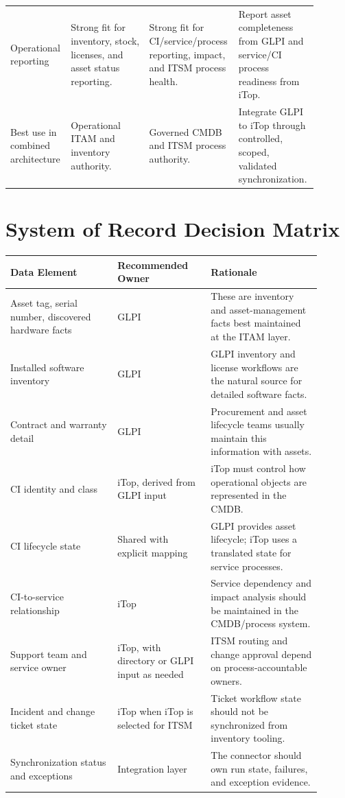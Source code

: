 \documentclass[11pt]{article}
\begin{document}
\begin{landscape}
\begin{longtable}{p{0.16\linewidth}p{0.25\linewidth}p{0.25\linewidth}p{0.23\linewidth}}
\addlinespace
Operational reporting & Strong fit for inventory, stock, licenses, and asset status reporting. & Strong fit for CI/service/process reporting, impact, and ITSM process health. & Report asset completeness from GLPI and service/CI process readiness from iTop. \\
\addlinespace
Best use in combined architecture & Operational ITAM and inventory authority. & Governed CMDB and ITSM process authority. & Integrate GLPI to iTop through controlled, scoped, validated synchronization. \\
\bottomrule
\end{longtable}
\normalsize
\end{landscape}

\section{System of Record Decision Matrix}

\begin{longtable}{p{0.31\linewidth}p{0.27\linewidth}p{0.32\linewidth}}
\toprule
\rowcolor{LightBlue}\textbf{Data Element} & \textbf{Recommended Owner} & \textbf{Rationale} \\
\midrule
Asset tag, serial number, discovered hardware facts & GLPI & These are inventory and asset-management facts best maintained at the ITAM layer. \\
Installed software inventory & GLPI & GLPI inventory and license workflows are the natural source for detailed software facts. \\
Contract and warranty detail & GLPI & Procurement and asset lifecycle teams usually maintain this information with assets. \\
CI identity and class & iTop, derived from GLPI input & iTop must control how operational objects are represented in the CMDB. \\
CI lifecycle state & Shared with explicit mapping & GLPI provides asset lifecycle; iTop uses a translated state for service processes. \\
CI-to-service relationship & iTop & Service dependency and impact analysis should be maintained in the CMDB/process system. \\
Support team and service owner & iTop, with directory or GLPI input as needed & ITSM routing and change approval depend on process-accountable owners. \\
Incident and change ticket state & iTop when iTop is selected for ITSM & Ticket workflow state should not be synchronized from inventory tooling. \\
Synchronization status and exceptions & Integration layer & The connector should own run state, failures, and exception evidence. \\
\bottomrule
\end{longtable}
\end{document}
